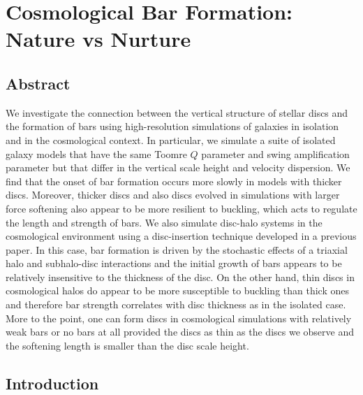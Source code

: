 
\chapter{Cosmological Bar Formation: Nature vs Nurture} \label{ch:paper_ii}


\section{Abstract}

We investigate the connection between the vertical structure of
stellar discs and the formation of bars using high-resolution
simulations of galaxies in isolation and in the cosmological context.
In particular, we simulate a suite of isolated galaxy models that have
the same Toomre $Q$ parameter and swing amplification parameter but
that differ in the vertical scale height and velocity dispersion.  We
find that the onset of bar formation occurs more slowly in models with
thicker discs.  Moreover, thicker discs and also discs evolved in
simulations with larger force softening also appear to be more
resilient to buckling, which acts to regulate the length and strength
of bars.  We also simulate disc-halo systems in the cosmological
environment using a disc-insertion technique developed in a previous
paper.  In this case, bar formation is driven by the stochastic
effects of a triaxial halo and subhalo-disc interactions and the
initial growth of bars appears to be relatively insensitive to the
thickness of the disc.  On the other hand, thin discs in cosmological
halos do appear to be more susceptible to buckling than thick ones and
therefore bar strength correlates with disc thickness as in the
isolated case.  More to the point, one can form discs in cosmological
simulations with relatively weak bars or no bars at all provided the
discs as thin as the discs we observe and the softening length is
smaller than the disc scale height.


\section{Introduction}

